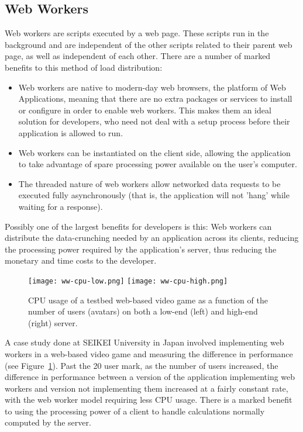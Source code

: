 \documentclass{acmsmall}
\begin{document}
\subsection{Web Workers}
\label{sec:webwork}

Web workers are scripts executed by a web page.  These scripts run in the background and are independent of the other scripts related to their parent web page, as well as independent of each other.  There are a number of marked benefits to this method of load distribution:

\begin{itemize}
\item Web workers are native to modern-day web browsers, the platform of Web Applications, meaning that there are no extra packages or services to install or configure in order to enable web workers.  This makes them an ideal solution for developers, who need not deal with a setup process before their application is allowed to run.
\item Web workers can be instantiated on the client side, allowing the application to take advantage of spare processing power available on the user's computer.
\item The threaded nature of web workers allow networked data requests to be executed fully asynchronously (that is, the application will not 'hang' while waiting for a response).
\end{itemize}

Possibly one of the largest benefits for developers is this: Web workers can distribute the data-crunching needed by an application across its clients, reducing the processing power required by the application's server, thus reducing the monetary and time costs to the developer.

\begin{figure}[h]
\begin{center}
\texttt{[image: ww-cpu-low.png]}
\texttt{[image: ww-cpu-high.png]}
\caption{CPU usage of a testbed web-based video game as a function of the number of users (avatars) on both a low-end (left) and high-end (right) server.\cite{okamotoWorkers}}
\end{center}
\label{fig:wwgraphs}
\end{figure}

A case study done at SEIKEI University in Japan involved implementing web workers in a web-based video game and measuring the difference in performance (see Figure~\ref{fig:wwgraphs}).  Past the 20 user mark, as the number of users increased, the difference in performance between a version of the application implementing web workers and version not implementing them increased at a fairly constant rate, with the web worker model requiring less CPU usage.\cite{okamotoWorkers}  There is a marked benefit to using the processing power of a client to handle calculations normally computed by the server.
\end{document}
